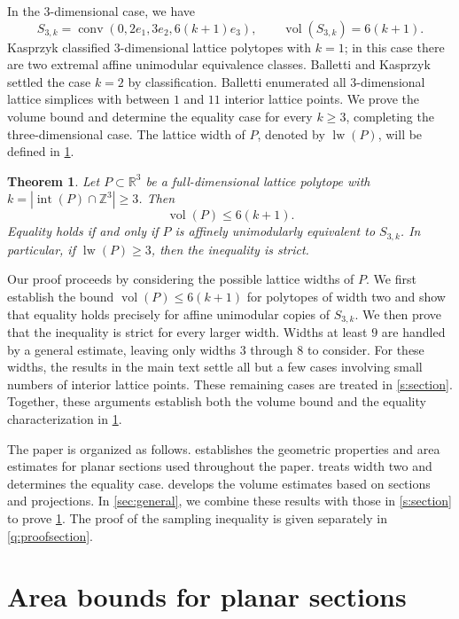\documentclass[reqno, 11pt]{article}
\numberwithin{equation}{section}
\newtheorem{theorem}{Theorem}[section]
\theoremstyle{definition}
\newcommand{\R}{\mathbb R}
\newcommand{\Z}{\mathbb Z}
\DeclareMathOperator{\Int}{int}
\DeclareMathOperator{\vol}{vol}
\DeclareMathOperator{\lw}{lw}
\DeclareMathOperator{\conv}{conv}
\numberwithin{equation}{section}
\begin{document}
In the $3$-dimensional case, we have 
\[
S_{3,k}=\conv(0,2e_1,3e_2,6(k+1)e_3),\qquad\vol(S_{3,k})=6(k+1).
\]
Kasprzyk \cite{Kas10} classified $3$-dimensional lattice polytopes with $k=1$; 
in this case there are two extremal affine unimodular equivalence classes. 
Balletti and Kasprzyk \cite[Corollary~5.2]{BK2016} settled the case $k=2$ by classification.
Balletti \cite{Bal21} enumerated all $3$-dimensional lattice simplices with between $1$ and $11$ interior lattice points.
We prove the volume bound and determine the equality case for every $k\ge3$, completing the three-dimensional case. 
The lattice width of $P$, denoted by $\lw(P)$, will be defined in \cref{sec:preliminaries}.

\begin{theorem}\label{main:theorem}
Let $P\subset\R^3$ be a full-dimensional lattice polytope with $k=|\Int(P)\cap\Z^3|\ge3$. Then
\begin{equation}\label{eq:main-bound}
 \vol(P)\le6(k+1).
\end{equation}
Equality holds if and only if $P$ is affinely unimodularly equivalent to $S_{3,k}$. In particular, if $\lw(P)\ge3$, then the inequality is strict.
\end{theorem}


Our proof proceeds by considering the possible lattice widths of $P$.
We first establish the bound $\vol(P)\le6(k+1)$ for polytopes
of width two and show that equality holds precisely for affine
unimodular copies of $S_{3,k}$. We then prove that the inequality
is strict for every larger width. Widths at least $9$ are
handled by a general estimate, leaving only widths $3$ through $8$ to consider. For these widths, the results in the main
text settle all but a few cases involving small numbers of
interior lattice points. These remaining cases are treated
in \cref{s:section}. Together, these arguments establish
both the volume bound and the equality characterization
in \cref{main:theorem}.

The paper is organized as follows.
 establishes the geometric properties
and area estimates for planar sections used throughout the paper.
 treats width two and determines the equality case.
 develops the volume estimates based on sections
and projections. In \cref{sec:general}, we combine these results
with those in \cref{s:section} to prove \cref{main:theorem}.
The proof of the sampling inequality is given separately
in \cref{q:proofsection}.


\section{Area bounds for planar sections}\label{sec:preliminaries}
\end{document}
